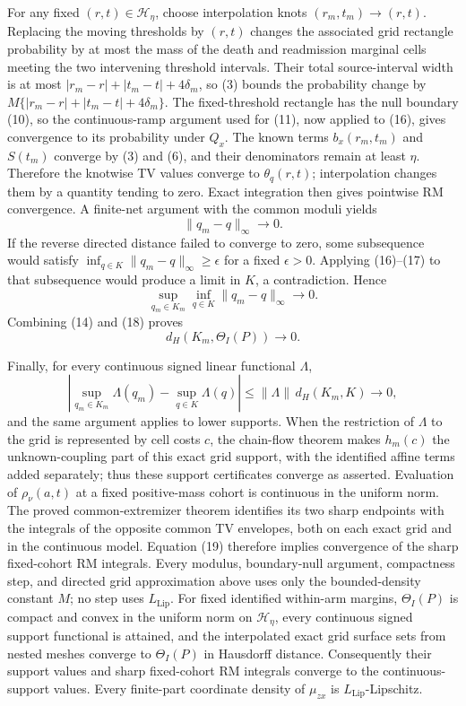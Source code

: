 For any fixed \((r,t)\in\mathcal H_\eta\), choose interpolation knots \((r_m,t_m)\to(r,t)\).  Replacing the moving thresholds by \((r,t)\) changes the associated grid rectangle probability by at most the mass of the death and readmission marginal cells meeting the two intervening threshold intervals.  Their total source-interval width is at most \(|r_m-r|+|t_m-t|+4\delta_m\), so (3) bounds the probability change by \(M\{|r_m-r|+|t_m-t|+4\delta_m\}\).  The fixed-threshold rectangle has the null boundary (10), so the continuous-ramp argument used for (11), now applied to (16), gives convergence to its probability under \(Q_x\).  The known terms \(b_x(r_m,t_m)\) and \(S(t_m)\) converge by (3) and (6), and their denominators remain at least \(\eta\).  Therefore the knotwise TV values converge to \(\theta_q(r,t)\); interpolation changes them by a quantity tending to zero.  Exact integration then gives pointwise RM convergence.  A finite-net argument with the common moduli yields
\[
 \|q_m-q\|_\infty\longrightarrow0. \tag{17}
\]
If the reverse directed distance failed to converge to zero, some subsequence would satisfy \(\inf_{q\in K}\|q_m-q\|_\infty\geq\epsilon\) for a fixed \(\epsilon>0\).  Applying (16)--(17) to that subsequence would produce a limit in \(K\), a contradiction.  Hence
\[
 \sup_{q_m\in K_m}\inf_{q\in K}\|q_m-q\|_\infty\longrightarrow0. \tag{18}
\]
Combining (14) and (18) proves
\[
 d_H(K_m,\Theta_I(P))\longrightarrow0. \tag{19}
\]

Finally, for every continuous signed linear functional \(\Lambda\),
\[
 \left|\sup_{q_m\in K_m}\Lambda(q_m)
       -\sup_{q\in K}\Lambda(q)\right|
 \leq \|\Lambda\|\,d_H(K_m,K)\longrightarrow0, \tag{20}
\]
and the same argument applies to lower supports.  When the restriction of \(\Lambda\) to the grid is represented by cell costs \(c\), the chain-flow theorem makes \(h_m(c)\) the unknown-coupling part of this exact grid support, with the identified affine terms added separately; thus these support certificates converge as asserted.  Evaluation of \(\rho_\nu(a,t)\) at a fixed positive-mass cohort is continuous in the uniform norm.  The proved common-extremizer theorem identifies its two sharp endpoints with the integrals of the opposite common TV envelopes, both on each exact grid and in the continuous model.  Equation (19) therefore implies convergence of the sharp fixed-cohort RM integrals.  Every modulus, boundary-null argument, compactness step, and directed grid approximation above uses only the bounded-density constant \(M\); no step uses \(L_{\mathrm{Lip}}\).
For fixed identified within-arm margins, \(\Theta_I(P)\) is compact and convex in the uniform norm on \(\mathcal H_\eta\), every continuous signed support functional is attained, and the interpolated exact grid surface sets from nested meshes converge to \(\Theta_I(P)\) in Hausdorff distance. Consequently their support values and sharp fixed-cohort RM integrals converge to the continuous-support values.
Every finite-part coordinate density of \(\mu_{zx}\) is \(L_{\mathrm{Lip}}\)-Lipschitz.
